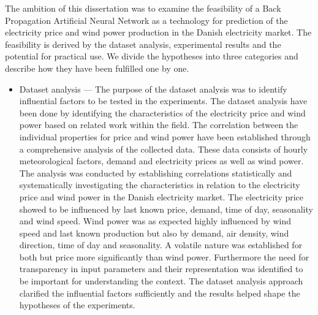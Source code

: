 The ambition of this dissertation was to examine the feasibility of a Back Propagation Artificial Neural Network as a technology for prediction of the electricity price and wind power production in the Danish electricity market. The feasibility is derived by the dataset analysis, experimental results and the potential for practical use. We divide the hypotheses into three categories and describe how they have been fulfilled one by one.

\begin{itemize}
\item Dataset analysis --- The purpose of the dataset analysis was to identify influential factors to be tested in the experiments. The dataset analysis have been done by identifying the characteristics of the electricity price and wind power based on related work within the field. The correlation between the individual properties for price and wind power have been established through a comprehensive analysis of the collected data. These data consists of hourly meteorological factors, demand and electricity prices as well as wind power. The analysis was conducted by establishing correlations statistically and systematically investigating the characteristics in relation to the electricity price and wind power in the Danish electricity market. The electricity price showed to be influenced by last known price, demand, time of day, seasonality and wind speed. Wind power was as expected highly influenced by wind speed and last known production but also by demand, air density, wind direction, time of day and seasonality. A volatile nature was established for both but price more significantly than wind power. Furthermore the need for transparency in input parameters and their representation was identified to be important for understanding the context. The dataset analysis approach clarified the influential factors sufficiently and the results helped shape the hypotheses of the experiments. 

\end{itemize}
